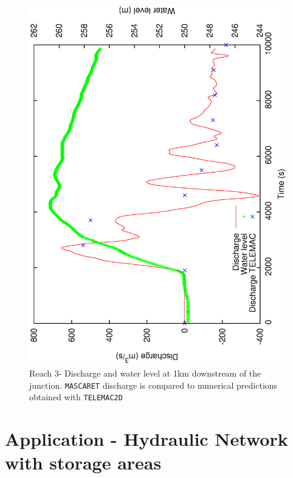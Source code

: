 \documentclass[a4paper,12pt]{article}
\begin{document}
\begin{figure}[!b]
  \begin{center}
  \includegraphics[scale=0.42,angle=-90]{junction_R3}
  \caption{Reach 3- Discharge and water level at 1km downstream of the junction. \texttt{MASCARET} discharge is compared to numerical predictions obtained with \texttt{TELEMAC2D}}
  \label{fig:Discharge-and-water_R3}
  \end{center}
\end{figure}


\newpage


\section{Application - Hydraulic Network with storage areas }
\end{document}
